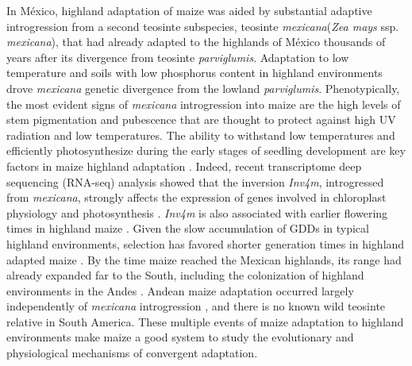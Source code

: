\documentclass[9pt,twocolumn,twoside,lineno]{biorxiv}
\newcommand{\mex}{\textit{mexicana}\xspace}
\newcommand{\parv}{\textit{parviglumis}\xspace}
\begin{document}
In M\'exico, highland adaptation of maize was aided by substantial adaptive introgression from a second teosinte subspecies, teosinte \mex (\textit{Zea mays} ssp. \mex), that had already adapted to the highlands of M\'exico thousands of years after its divergence from teosinte \parv \cite{Hufford2013-gs, Gonzalez-Segovia2019-jy}. 
Adaptation to low temperature and soils with low phosphorus content in highland environments drove \mex genetic divergence from the lowland \parv \cite{AguirreLiguori2019-fl}.
Phenotypically, the most evident signs of \mex introgression into maize are the high levels of stem pigmentation and pubescence \cite{Lauter2004-eq} that are thought to protect against high UV radiation and low temperatures. 
The ability to withstand low temperatures and efficiently photosynthesize during the early stages of seedling development are key factors in maize highland adaptation \cite{Hardacre1980-tq}.
Indeed, recent transcriptome deep sequencing (RNA-seq) analysis showed that the inversion \textit{Inv4m}, introgressed from \mex, strongly affects the expression of genes involved in chloroplast physiology and photosynthesis \cite{Crow2020-gene}.  
\textit{Inv4m} is also associated with earlier flowering times in highland maize \cite{Romero_Navarro2017-cn, Gates2019-xu}. 
Given the slow accumulation of GDDs in typical highland environments, selection has favored shorter generation  times in highland adapted maize \cite{Gates2019-xu}.
By the time maize reached the Mexican highlands, its range had already expanded far to the South, including the colonization of highland environments in the  Andes \cite{Athens2016-ep, Grobman2012-pm}. 
Andean maize adaptation occurred largely independently of \mex introgression \cite{Takuno2015-uj, Wang2020-mp}, and there is no known wild teosinte relative in South America. 
These multiple events of maize adaptation to highland environments make maize a good system to study the evolutionary and physiological mechanisms of convergent adaptation. %
\end{document}
